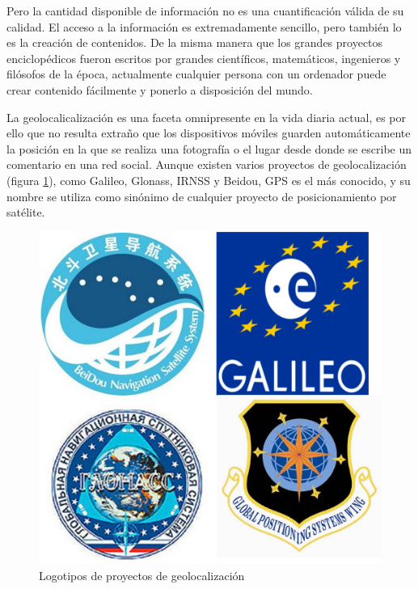 Pero la cantidad disponible de información no es una cuantificación válida de su calidad. El acceso a la información es extremadamente sencillo, pero también lo es la creación de contenidos. De la misma manera que los grandes proyectos enciclopédicos fueron escritos por grandes científicos, matemáticos, ingenieros y filósofos de la época, actualmente cualquier persona con un ordenador puede crear contenido fácilmente y ponerlo a disposición del mundo.


La geolocalicalización es una faceta omnipresente en la vida diaria actual, es por ello que no resulta extraño que los dispositivos móviles guarden automáticamente la posición en la que se realiza una fotografía o el lugar desde donde se escribe un comentario en una red social. Aunque existen varios proyectos de geolocalización (figura \ref{Logos_satelites}), como Galileo, Glonass, IRNSS y Beidou, GPS es el más conocido, y su nombre se utiliza como sinónimo de cualquier proyecto de posicionamiento por satélite.

\begin{figure}[hbtp]
\centering
\includegraphics[scale=1]{images/introduccion/Sistemas_posicionamiento_satelites.jpg}
\caption{Logotipos de proyectos de geolocalización}
\label{Logos_satelites}
\end{figure}


